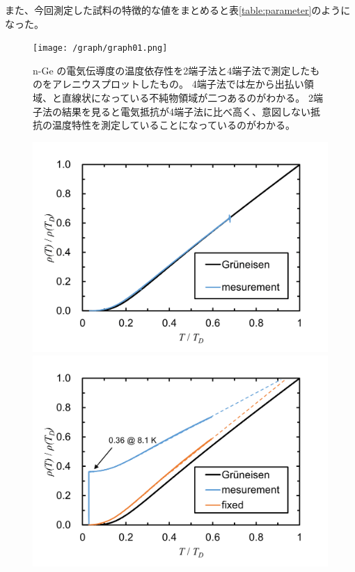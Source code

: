 \documentclass[11pt,dvipdfmx,a4paper]{jsarticle}
\begin{document}
また、今回測定した試料の特徴的な値をまとめると表\ref{table:parameter}のようになった。
\begin{figure}[h]
    \centering
    \texttt{[image: /graph/graph01.png]}
    \caption{n-Ge の電気伝導度の温度依存性を2端子法と4端子法で測定したものをアレニウスプロットしたもの。
    4端子法では左から出払い領域、と直線状になっている不純物領域が二つあるのがわかる。
    2端子法の結果を見ると電気抵抗が4端子法に比べ高く、意図しない抵抗の温度特性を測定していることになっているのがわかる。}
    \label{graph:n-Ge_ex}
\end{figure}

\begin{figure}[h]
    \centering
    \begin{minipage}[t]{0.48\columnwidth}
        \centering
        \includegraphics[width=\columnwidth]{graph/graph02.png}
    \end{minipage}
    \hfill
    \begin{minipage}[t]{0.48\columnwidth}
        \centering
        \includegraphics[width=\columnwidth]{graph/graph03.png} %

\end{minipage}
\end{figure}
\end{document}
